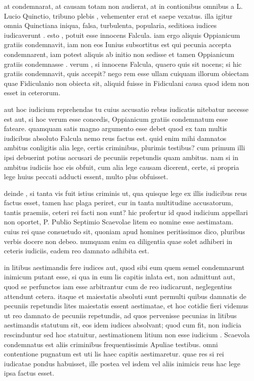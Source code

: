 at condemnarat, at causam totam non audierat, at in contionibus omnibus a L. Lucio Quinctio, tribuno plebis , vehementer erat et saepe vexatus. illa igitur omnia Quinctiana iniqua, falsa, turbulenta, popularia, seditiosa iudices iudicaverunt . esto , potuit esse innocens Falcula. iam ergo aliquis Oppianicum gratiis condemnavit, iam non eos Iunius subsortitus est qui pecunia accepta condemnarent, iam potest aliquis ab initio non sedisse et tamen Oppianicum gratiis condemnasse . verum , si innocens Falcula, quaero quis sit nocens; si hic gratiis condemnavit, quis accepit? nego rem esse ullam cuiquam illorum obiectam quae Fidiculanio non obiecta sit, aliquid fuisse in Fidiculani causa quod idem non esset in ceterorum.

 aut hoc iudicium reprehendas tu cuius accusatio rebus iudicatis nitebatur necesse est aut, si hoc verum esse concedis, Oppianicum gratiis condemnatum esse fateare. quamquam satis magno argumento esse debet quod ex tam multis iudicibus absoluto Falcula nemo reus factus est. quid enim mihi damnatos ambitus conligitis alia lege, certis criminibus, plurimis testibus? cum primum illi ipsi debuerint potius accusari de pecuniis repetundis quam ambitus. nam si in ambitus iudiciis hoc eis obfuit, cum alia lege causam dicerent, certe, si propria lege huius peccati adducti essent, multo plus obfuisset.

 deinde , si tanta vis fuit istius criminis ut, qua quisque lege ex illis iudicibus reus factus esset, tamen hac plaga periret, cur in tanta multitudine accusatorum, tantis praemiis, ceteri rei facti non sunt? hic profertur id quod iudicium appellari non oportet, P. Publio Septimio Scaevolae litem eo nomine esse aestimatam. cuius rei quae consuetudo sit, quoniam apud homines peritissimos dico, pluribus verbis docere non debeo. numquam enim ea diligentia quae solet adhiberi in ceteris iudiciis, eadem reo damnato adhibita est.

 in litibus aestimandis fere iudices aut, quod sibi eum quem semel condemnarunt inimicum putant esse, si qua in eum lis capitis inlata est, non admittunt aut, quod se perfunctos iam esse arbitrantur cum de reo iudicarunt, neglegentius attendunt cetera. itaque et maiestatis absoluti sunt permulti quibus damnatis de pecuniis repetundis lites maiestatis essent aestimatae, et hoc cotidie fieri videmus ut reo damnato de pecuniis repetundis, ad quos pervenisse pecunias in litibus aestimandis statutum sit, eos idem iudices absolvant; quod cum fit, non iudicia rescinduntur sed hoc statuitur, aestimationem litium non esse iudicium . Scaevola condemnatus est aliis criminibus frequentissimis Apuliae testibus. omni contentione pugnatum est uti lis haec capitis aestimaretur. quae res si rei iudicatae pondus habuisset, ille postea vel isdem vel aliis inimicis reus hac lege ipsa factus esset.


